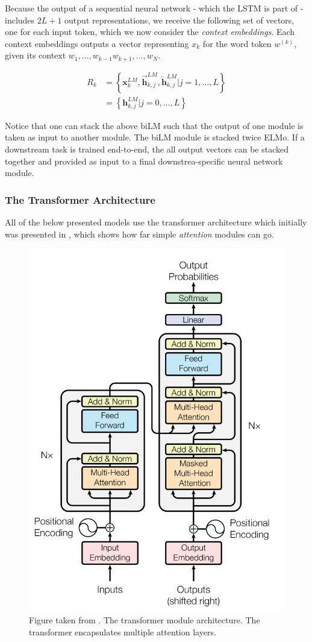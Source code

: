 \documentclass[a4paper,12pt,twoside,openright]{report}
\begin{document}
Because the output of a sequential neural network - which the LSTM is part of - includes $2L + 1$ output representations, we receive the following set of vectors, one for each input token, which we now consider the \textit{context embeddings}.
Each context embeddings outputs a vector representing $x_{k}$ for the word token $w^{(k)}$, given its context $ w_{1}, \ldots, w_{k-1}  w_{k+1}, \ldots, w_{N}$.

\begin{align} 
R_{k} &=\left\{\mathbf{x}_{k}^{L M}, \overrightarrow{\mathbf{h}}_{k, j}^{L M}, \overleftarrow{\mathbf{h}}_{k, j}^{L M} | j=1, \ldots, L\right\} \\ &=\left\{\mathbf{h}_{k, j}^{L M} | j=0, \ldots, L\right\} 
\end{align}

Notice that one can stack the above biLM such that the output of one module is taken as input to another module.
The biLM module is stacked twice ELMo.
If a downstream task is trained end-to-end, the all output vectors can be stacked together and provided as input to a final downstrea-specific neural network module.

\subsubsection{The Transformer Architecture}

All of the below presented models use the transformer architecture which initially was presented in \cite{vaswani17}, which shows how far simple \textit{attention} modules can go.


\begin{figure}[h]
	\center
  \includegraphics[width=0.4\linewidth]{./assets/background/transformer_module.png}
  \caption{Figure taken from \cite{vaswani17}. The transformer module architecture. The transformer encapsulates multiple attention layers.}
  \label{fig:cbow_skipgram}
\end{figure}
\end{document}
